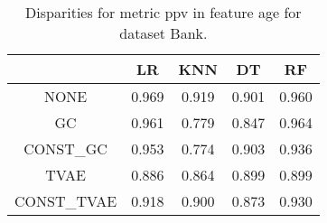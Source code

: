 \begin{table}
\caption{Disparities for metric ppv in feature age for dataset Bank.}
\label{tab:disp-BANK-age-ppv}
\begin{tabular}{ccccc}
\toprule
 & LR & KNN & DT & RF \\
\midrule
NONE & 0.969 & 0.919 & 0.901 & 0.960 \\
GC & 0.961 & 0.779 & 0.847 & 0.964 \\
CONST\_GC & 0.953 & 0.774 & 0.903 & 0.936 \\
TVAE & 0.886 & 0.864 & 0.899 & 0.899 \\
CONST\_TVAE & 0.918 & 0.900 & 0.873 & 0.930 \\
\bottomrule
\end{tabular}
\end{table}
